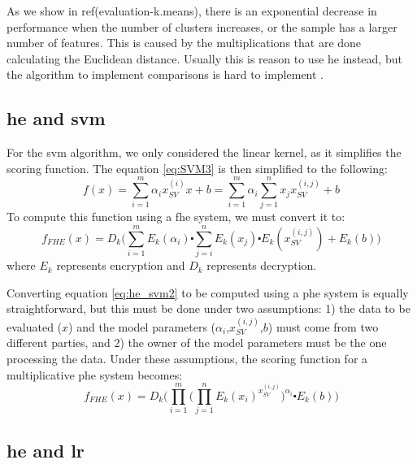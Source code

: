 As we show in ref(evaluation-k.means), there is an exponential decrease in performance when the number of clusters increases, or the sample has a larger number of features. This is caused by the multiplications that are done calculating the Euclidean distance. Usually this is reason to use \ac{he} instead, but the algorithm to implement comparisons is hard to implement \cite{blake2004strong}.




\subsection{\acl{he} and \acl{svm}}
\label{ssec:HEandSVM}

For the \ac{svm} algorithm, we only considered the linear kernel, as it simplifies the scoring function. The equation \ref{eq:SVM3} is then simplified to the following:
\begin{equation}
\label{eq:he_svm1}
f(x)=\sum_{i=1}^m \alpha_i x_{SV}^{(i)}x+b = \sum_{i=1}^m \alpha_i \sum_{j=1}^n x_j x_{SV}^{(i,j)} + b
\end{equation}
To compute this function using a \ac{fhe} system, we must convert it to:
\begin{equation}
\label{eq:he_svm2}
f_{FHE}(x) = D_k\Bigg( \sum_{i=1}^m E_k(\alpha_i) \centerdot \sum_{j=i}^n E_k(x_j) \centerdot E_k(x_{SV}^{(i,j)}) + E_k(b)\Bigg)
\end{equation}
where $E_k$ represents encryption and $D_k$ represents decryption.

Converting equation \ref{eq:he_svm2} to be computed using a \ac{phe} system is equally straightforward, but this must be done under two assumptions: 1) the data to be evaluated ($x$) and the model parameters ($\alpha_i$,$x_{SV}^{(i,j)}$,$b$) must come from two different parties, and 2) the owner of the model parameters must be the one processing the data. Under these assumptions, the scoring function for a multiplicative \ac{phe} system becomes:
\begin{equation}
\label{eq:he_svm3}
f_{FHE}(x) = D_k\Bigg( \prod_{i=1}^m \bigg(\prod_{j=1}^n E_k(x_i)^{x_{SV}^{(i,j)}} \bigg)^{\alpha_i} \centerdot E_k(b) \Bigg)
\end{equation}

\subsection{\acl{he} and \acl{lr}}
\label{ssec:HEandLR}

